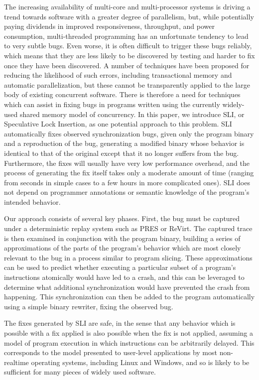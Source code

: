 \documentclass[10pt,twocolumn,preprint,natbib,authoryear]{sigplanconf}
\begin{document}
The increasing availability of multi-core and multi-processor systems
is driving a trend towards software with a greater degree of
parallelism, but, while potentially paying dividends in improved
responsiveness, throughput, and power consumption, multi-threaded
programming has an unfortunate tendency to lead to very subtle bugs.
Even worse, it is often difficult to trigger these bugs reliably,
which means that they are less likely to be discovered by testing and
harder to fix once they have been discovered.  A number of techniques
have been proposed for reducing the likelihood of such errors,
including transactional memory\cite{Shavit1997} and automatic
parallelization\cite{Bacon1994}, but these cannot be transparently
applied to the large body of existing concurrent software.  There is
therefore a need for techniques which can assist in fixing bugs in
programs written using the currently widely-used shared memory model
of concurrency.  In this paper, we introduce SLI, or Speculative Lock
Insertion, as one potential approach to this problem.  SLI
automatically fixes observed synchronization bugs, given only the
program binary and a reproduction of the bug, generating a modified
binary whose behavior is identical to that of the original except that
it no longer suffers from the bug.  Furthermore, the fixes will
usually have very low performance overhead, and the process of
generating the fix itself takes only a moderate amount of time
(ranging from seconds in simple cases to a few hours in more
complicated ones).  SLI does not depend on programmer annotations or
semantic knowledge of the program's intended behavior.

Our approach consists of several key phases.  First, the bug must be
captured under a deterministic replay system such as
PRES\cite{Park2009} or ReVirt\cite{Dunlap2002}.  The captured trace is
then examined in conjunction with the program binary, building a
series of approximations of the parts of the program's behavior which
are most closely relevant to the bug in a process similar to program
slicing\cite{Weiser1979}.  These approximations can be used to predict
whether executing a particular subset of a program's instructions
atomically would have led to a crash, and this can be leveraged to
determine what additional synchronization would have prevented the
crash from happening.  This synchronization can then be added to the
program automatically using a simple binary rewriter, fixing the
observed bug.

The fixes generated by SLI are safe, in the sense that any behavior
which is possible with a fix applied is also possible when the fix is
not applied, assuming a model of program execution in which
instructions can be arbitrarily delayed.  This corresponds to the
model presented to user-level applications by most non-realtime
operating systems, including Linux and Windows, and so is likely to be
sufficient for many pieces of widely used software.
\end{document}
